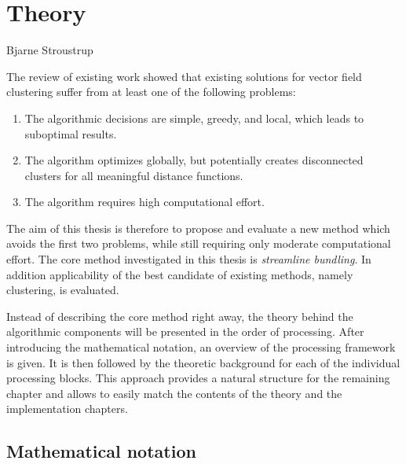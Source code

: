 


\chapter{Theory}
\label{chp:theory}
{Bjarne Stroustrup}%
%

The review of existing work showed that existing solutions for vector field clustering suffer from at least one of the following problems:
%
\begin{enumerate}
%
	\item The algorithmic decisions are simple, greedy, and local, which leads to suboptimal results.%
%
	\item The algorithm optimizes globally, but potentially creates disconnected clusters for all meaningful distance functions.
%
	\item The algorithm requires high computational effort.
%
\end{enumerate}


The aim of this thesis is therefore to propose and evaluate a new method which avoids the first two problems, while still requiring only moderate computational effort. The core method investigated in this thesis is \emph{streamline bundling}. In addition applicability of the best candidate of existing methods, namely  clustering, is evaluated.

Instead of describing the core method right away, the theory behind the algorithmic components will be presented in the order of processing. After introducing the mathematical notation, an overview of the processing framework is given. It is then followed by the theoretic background for each of the individual processing blocks. This approach provides a natural structure for the remaining chapter and allows to easily match the contents of the theory and the implementation chapters.


\section{Mathematical notation}


